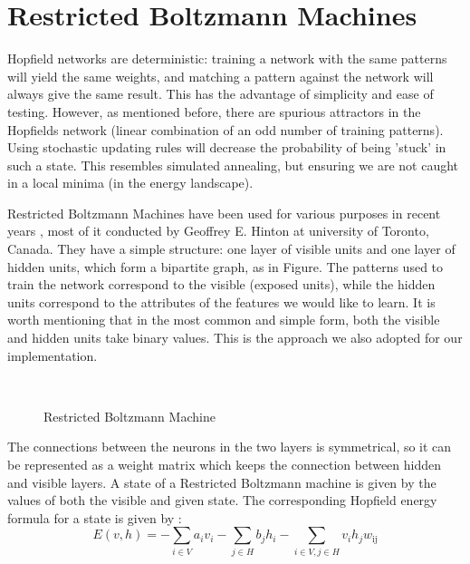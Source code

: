
\newcommand{\nocomma}{}
\newcommand{\noplus}{}
\newcommand{\tmop}[1]{\ensuremath{\operatorname{#1}}}
\newcommand{\tmtextbf}[1]{{\bfseries{#1}}}
\newcommand{\tmtextit}[1]{{#1}}
\newcommand{\tmtexttt}[1]{{\ttfamily{#1}}}
\newenvironment{descriptioncompact}{\begin{description} }{\end{description}}


\section{Restricted Boltzmann Machines}

Hopfield networks are deterministic: training a network with the same patterns
will yield the same weights, and matching a pattern against the network will
always give the same result. This has the advantage of simplicity and ease of
testing. However, as mentioned before, there are spurious attractors in the
Hopfields network (linear combination of an odd number of training patterns).
Using stochastic updating rules will decrease the probability of being 'stuck'
in such a state. This resembles simulated annealing, but ensuring we are not
caught in a local minima (in the energy landscape).

Restricted Boltzmann Machines have been used for various purposes in recent
years 
\cite{louradour2011classification} \cite{teh2001rate} \cite{nair2010rectified}
, most of it
conducted by Geoffrey E. Hinton at university of Toronto, Canada. They have a
simple structure: one layer of visible units and one layer of hidden units,
which form a bipartite graph, as in Figure. The patterns used to train the
network correspond to the visible (exposed units), while the hidden units
correspond to the attributes of the features we would like to learn. It is
worth mentioning that in the most common and simple form, both the visible and
hidden units take binary values. This is the approach we also adopted for our
implementation.

\ \ \ \ \ \ \ \ \ \ \ \ \ \ \ \ \ \ \ \ \ \ \ \ \ \ \ \ \begin{figure}[h]
  \caption{Restricted Boltzmann Machine}
\end{figure}


The connections between the neurons in the two layers is symmetrical, so it
can be represented as a weight matrix which keeps the connection between hidden
and visible layers. A state of a Restricted Boltzmann machine is given by the
values of both the visible and given state. The corresponding Hopfield energy
formula for a state is given by :
\[ E (v, h) = - \sum_{i \in V} a_i v_i - \sum_{j \in H} b_j h_i - \sum_{i \in
   V, \nocomma j \in H \nocomma} v_i h_j w_{\tmtextit{\tmtextit{\tmop{ij}}}}
\]


